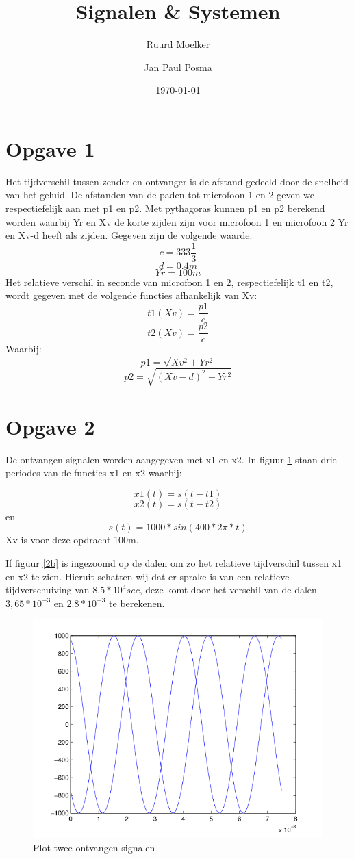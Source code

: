 \documentclass{article}
\author{Ruurd Moelker \and Jan Paul Posma}
\date{\today}
\title{Signalen \& Systemen}
\begin{document}
\maketitle 

\section{Opgave 1}
Het tijdverschil tussen zender en ontvanger is de afstand gedeeld door de snelheid van het geluid. De afstanden van de paden tot microfoon 1 en 2 geven we respectiefelijk aan met p1 en p2. Met pythagoras kunnen p1 en p2 berekend worden waarbij Yr en Xv de korte zijden zijn voor microfoon 1 en microfoon 2 Yr en Xv-d heeft als zijden. Gegeven zijn de volgende waarde:
$$c = 333\frac{1}{3}$$ $$d = 0.4m$$ $$Yr = 100m$$
Het relatieve verschil in seconde van microfoon 1 en 2, respectiefelijk t1 en t2, wordt gegeven met de volgende functies afhankelijk van Xv:
$$t1(Xv) = \frac{p1}{c}$$ $$t2(Xv) = \frac{p2}{c}$$
Waarbij:
$$p1 = \sqrt{Xv^2 + Yr^2}$$ $$p2 = \sqrt{(Xv-d)^2 + Yr^2}$$ 

\section{Opgave 2}
De ontvangen signalen worden aangegeven met x1 en x2. In figuur \ref{2a} staan drie periodes van de functies x1 en x2 waarbij:

$$x1(t) = s(t - t1)$$ $$x2(t) = s(t - t2)$$ en $$s(t) = 1000*sin(400*2\pi*t)$$
Xv is voor deze opdracht 100m.

If figuur \ref{2b} is ingezoomd op de dalen om zo het relatieve tijdverschil tussen x1 en x2 te zien. Hieruit schatten wij dat er sprake is van een relatieve tijdverschuiving van \begin{math}8.5*10^4 sec\end{math}, deze komt door het verschil van de dalen $3,65*10^{-3}$ en $2.8*10^{-3}$ te berekenen.

\begin{figure}
	\begin{center}
	\includegraphics{2a.png}
	\caption{Plot twee ontvangen signalen}
	\end{center}
 \label{2a}
\end{figure}
\end{document}
